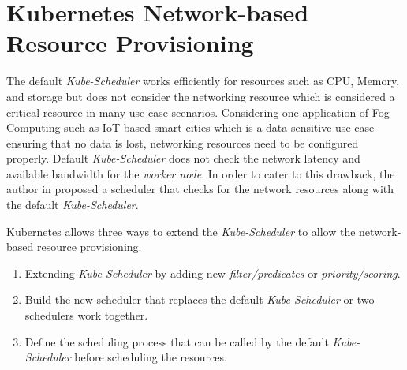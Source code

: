 \section{Kubernetes Network-based Resource Provisioning}
\label{sec:k8s_ns}
The default \emph{Kube-Scheduler} works efficiently for resources such as CPU, Memory, and storage but does not consider the networking resource which is considered a critical resource in many use-case scenarios\cite{Santos2019}. Considering one application of Fog Computing such as IoT based smart cities which is a data-sensitive use case ensuring that no data is lost, networking resources need to be configured properly\cite{Santos2019}. Default \emph{Kube-Scheduler} does not check the network latency and available bandwidth for the \emph{worker node}. In order to cater to this drawback, the author in \cite{Santos2019} proposed a scheduler that checks for the network resources along with the default \emph{Kube-Scheduler}\cite{Santos2019}. \par
Kubernetes allows three ways to extend the \emph{Kube-Scheduler} to allow the network-based resource provisioning\cite{k8s}.
\begin{enumerate}
  \item Extending \emph{Kube-Scheduler} by adding new \emph{filter/predicates} or \emph{priority/scoring}.
  \item Build the new scheduler that replaces the default \emph{Kube-Scheduler} or two schedulers work together.
  \item Define the scheduling process that can be called by the default \emph{Kube-Scheduler} before scheduling the resources.
\end{enumerate}
